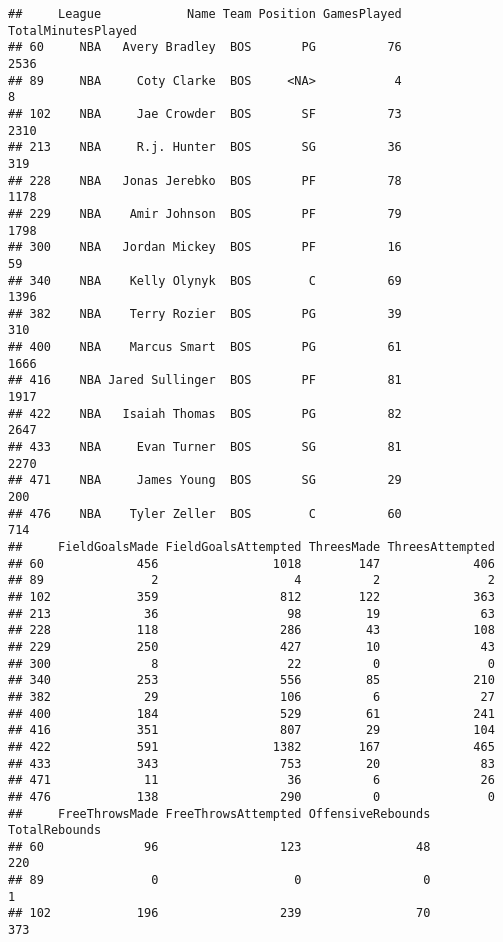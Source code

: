 \documentclass[]{book}
\begin{document}
\begin{verbatim}
##     League            Name Team Position GamesPlayed TotalMinutesPlayed
## 60     NBA   Avery Bradley  BOS       PG          76               2536
## 89     NBA     Coty Clarke  BOS     <NA>           4                  8
## 102    NBA     Jae Crowder  BOS       SF          73               2310
## 213    NBA     R.j. Hunter  BOS       SG          36                319
## 228    NBA   Jonas Jerebko  BOS       PF          78               1178
## 229    NBA    Amir Johnson  BOS       PF          79               1798
## 300    NBA   Jordan Mickey  BOS       PF          16                 59
## 340    NBA    Kelly Olynyk  BOS        C          69               1396
## 382    NBA    Terry Rozier  BOS       PG          39                310
## 400    NBA    Marcus Smart  BOS       PG          61               1666
## 416    NBA Jared Sullinger  BOS       PF          81               1917
## 422    NBA   Isaiah Thomas  BOS       PG          82               2647
## 433    NBA     Evan Turner  BOS       SG          81               2270
## 471    NBA     James Young  BOS       SG          29                200
## 476    NBA    Tyler Zeller  BOS        C          60                714
##     FieldGoalsMade FieldGoalsAttempted ThreesMade ThreesAttempted
## 60             456                1018        147             406
## 89               2                   4          2               2
## 102            359                 812        122             363
## 213             36                  98         19              63
## 228            118                 286         43             108
## 229            250                 427         10              43
## 300              8                  22          0               0
## 340            253                 556         85             210
## 382             29                 106          6              27
## 400            184                 529         61             241
## 416            351                 807         29             104
## 422            591                1382        167             465
## 433            343                 753         20              83
## 471             11                  36          6              26
## 476            138                 290          0               0
##     FreeThrowsMade FreeThrowsAttempted OffensiveRebounds TotalRebounds
## 60              96                 123                48           220
## 89               0                   0                 0             1
## 102            196                 239                70           373

\end{verbatim}
\end{document}
